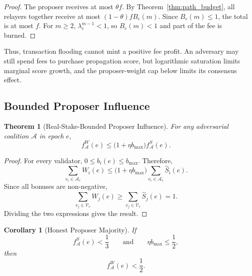 \documentclass[lettersize,journal]{IEEEtran}
\newtheorem{theorem}{Theorem}
\newtheorem{corollary}{Corollary}
\begin{document}
\begin{proof}
The proposer receives at most $\theta f$.
By Theorem~\ref{thm:path_budget}, all relayers together receive at most
$(1-\theta)fB_e(m)$.
Since $B_e(m)\leq1$, the total is at most $f$.
For $m\geq2$, $\lambda_e^{m-1}<1$, so $B_e(m)<1$ and part of the fee is burned.
\end{proof}

Thus, transaction flooding cannot mint a positive fee profit.
An adversary may still spend fees to purchase propagation score, but logarithmic saturation limits marginal score growth, and the proposer-weight cap below limits its consensus effect.


\subsection{Bounded Proposer Influence}

\begin{theorem}[Real-Stake-Bounded Proposer Influence]
\label{thm:bounded_influence}
For any adversarial coalition $\mathcal{A}$ in epoch $e$,
\begin{equation}
f_{\mathcal{A}}^{W}(e)
\leq
\bigl(1+\eta b_{\max}\bigr)
f_{\mathcal{A}}^{S}(e).
\end{equation}
\end{theorem}

\begin{proof}
For every validator,
$0\leq b_i(e)\leq b_{\max}$.
Therefore,
\begin{equation}
\sum_{v_i\in\mathcal{A}_e}
W_i(e)
\leq
\bigl(1+\eta b_{\max}\bigr)
\sum_{v_i\in\mathcal{A}_e}
\hat S_i(e).
\end{equation}
Since all bonuses are non-negative,
\begin{equation}
\sum_{v_j\in\mathcal{V}_e}W_j(e)
\geq
\sum_{v_j\in\mathcal{V}_e}\hat S_j(e)
=
1.
\end{equation}
Dividing the two expressions gives the result.
\end{proof}

\begin{corollary}[Honest Proposer Majority]
\label{cor:honest_proposer_majority}
If
\begin{equation}
f_{\mathcal{A}}^{S}(e)<\frac{1}{3}
\qquad\text{and}\qquad
\eta b_{\max}\leq\frac{1}{2},
\end{equation}
then
\begin{equation}
f_{\mathcal{A}}^{W}(e)<\frac{1}{2}.
\end{equation}
\end{corollary}
\end{document}
